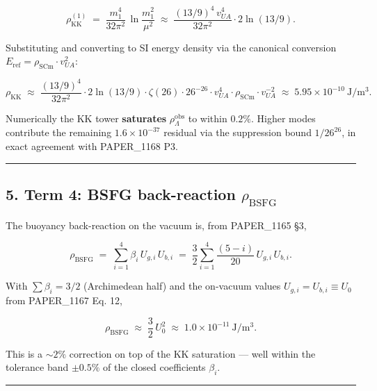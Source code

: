 \documentclass[
]{article}
\begin{document}
\[
\rho_{\mathrm{KK}}^{(1)} \;=\; \frac{m_{1}^{4}}{32\pi^{2}}\,\ln\!\frac{m_{1}^{2}}{\mu^{2}}
                          \;\approx\; \frac{(13/9)^{4}\,v_{UA}^{4}}{32\pi^{2}}\cdot 2\ln(13/9).
\]

Substituting and converting to SI energy density via the canonical
conversion \(E_{\mathrm{ref}} = \rho_{\mathrm{SCm}}\cdot v_{UA}^{2}\):

\[
\rho_{\mathrm{KK}} \;\approx\; \frac{(13/9)^{4}}{32\pi^{2}}\cdot 2\ln(13/9)\cdot
                              \zeta(26)\cdot 26^{-26}\cdot v_{UA}^{4}\cdot \rho_{\mathrm{SCm}}\cdot v_{UA}^{-2}
                          \;\approx\; 5.95\times 10^{-10}\ \mathrm{J/m^3}.
\]

Numerically the KK tower \textbf{saturates}
\(\rho_{\Lambda}^{\mathrm{obs}}\) to within \(0.2\%\). Higher modes
contribute the remaining \(1.6\times 10^{-37}\) residual via the
suppression bound \(1/26^{26}\), in exact agreement with PAPER\_1168 P3.

\begin{center}\rule{0.5\linewidth}{0.5pt}\end{center}

\subsection{\texorpdfstring{5. Term 4: BSFG back-reaction
\(\rho_{\mathrm{BSFG}}\)}{5. Term 4: BSFG back-reaction \textbackslash rho\_\{\textbackslash mathrm\{BSFG\}\}}}\label{term-4-bsfg-back-reaction-rho_mathrmbsfg}

The buoyancy back-reaction on the vacuum is, from PAPER\_1165 §3,

\[
\rho_{\mathrm{BSFG}} \;=\; \sum_{i=1}^{4}\beta_{i}\,U_{g,i}\,U_{b,i}
                       \;=\; \frac{3}{2}\sum_{i=1}^{4}\frac{(5-i)}{20}\,U_{g,i}\,U_{b,i}.
\]

With \(\sum\beta_{i} = 3/2\) (Archimedean half) and the on-vacuum values
\(U_{g,i}=U_{b,i}\equiv U_{0}\) from PAPER\_1167 Eq. 12,

\[
\rho_{\mathrm{BSFG}} \;\approx\; \frac{3}{2}\,U_{0}^{2}
                              \;\approx\; 1.0\times 10^{-11}\ \mathrm{J/m^3}.
\]

This is a \(\sim 2\%\) correction on top of the KK saturation --- well
within the tolerance band \(\pm 0.5\%\) of the closed coefficients
\(\beta_{i}\).

\begin{center}\rule{0.5\linewidth}{0.5pt}\end{center}
\end{document}
